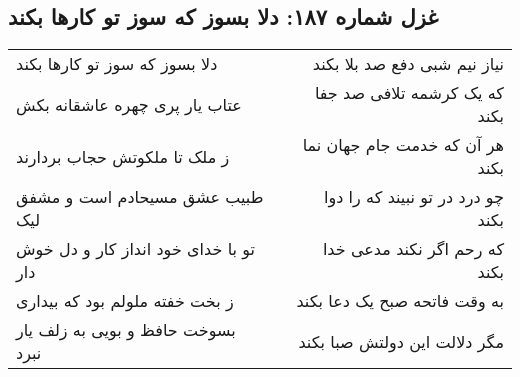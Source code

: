 \begin{center}
\section*{غزل شماره ۱۸۷: دلا بسوز که سوز تو کارها بکند}
\label{sec:sh187}
\begin{longtable}{l p{0.5cm} r}
دلا بسوز که سوز تو کارها بکند
&&
نیاز نیم شبی دفع صد بلا بکند
\\
عتاب یار پری چهره عاشقانه بکش
&&
که یک کرشمه تلافی صد جفا بکند
\\
ز ملک تا ملکوتش حجاب بردارند
&&
هر آن که خدمت جام جهان نما بکند
\\
طبیب عشق مسیحادم است و مشفق لیک
&&
چو درد در تو نبیند که را دوا بکند
\\
تو با خدای خود انداز کار و دل خوش دار
&&
که رحم اگر نکند مدعی خدا بکند
\\
ز بخت خفته ملولم بود که بیداری
&&
به وقت فاتحه صبح یک دعا بکند
\\
بسوخت حافظ و بویی به زلف یار نبرد
&&
مگر دلالت این دولتش صبا بکند
\\
\end{longtable}
\end{center}
